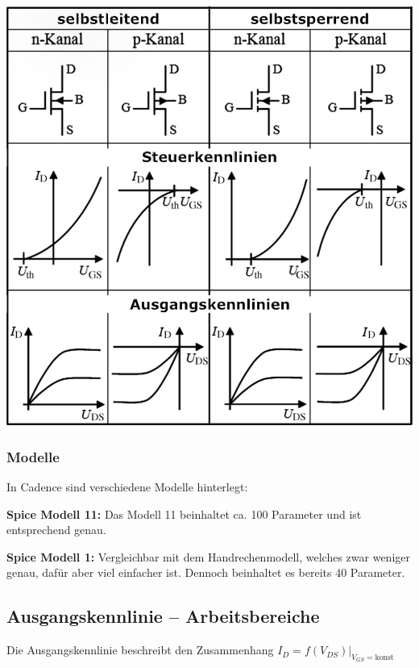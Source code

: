 \begin{minipage}[t]{0.5\columnwidth}
    \includegraphics[width=\columnwidth, align=t]{images/02_MOSFET_uebersicht.pdf}
\end{minipage}



\subsubsection{Modelle}
In Cadence sind verschiedene Modelle hinterlegt:

\textbf{Spice Modell 11:} Das Modell 11 beinhaltet ca. 100 Parameter und ist entsprechend genau.

\textbf{Spice Modell 1:} Vergleichbar mit dem Handrechenmodell, welches zwar weniger genau, dafür aber viel einfacher ist. Dennoch beinhaltet es bereits 40 Parameter.

\subsection{Ausgangskennlinie -- Arbeitsbereiche}
 
Die Ausgangskennlinie beschreibt den Zusammenhang $I_D = f(V_{DS}) \big|_{V_{GS} = \text{konst}}$


